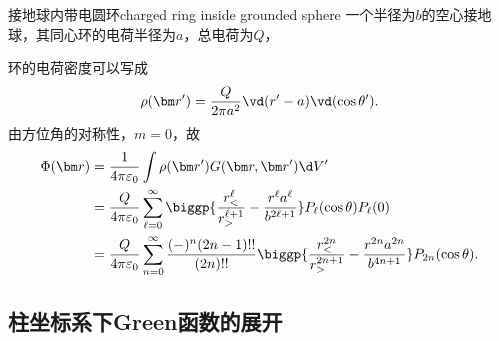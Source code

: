 \begin{example}{接地球内带电圆环}{charged ring inside grounded sphere}
    一个半径为$b$的空心接地球，其同心环的电荷半径为$a$，总电荷为$Q$，

    环的电荷密度可以写成
    \[
        \rho(\bm r')=\frac Q{2\pi a^2}\vd(r'-a)\vd(\cos\theta').
    \]
    由方位角的对称性，$m=0$，故
    \begin{align*}
        \Phi(\bm r)&=\frac1{4\pi\varepsilon_0}\int\rho(\bm r')G(\bm r,\bm r')\d V'\\
        &=\frac Q{4\pi\varepsilon_0}\sum_{\ell=0}^\infty\biggp{\frac{r_<^\ell}{r_>^{\ell+1}}-\frac{r^\ell a^\ell}{b^{2\ell+1}}}P_\ell(\cos\theta)P_\ell(0)\\
        &=\frac Q{4\pi\varepsilon_0}\sum_{n=0}^\infty\frac{(-)^n(2n-1)!!}{(2n)!!}\biggp{\frac{r_<^{2n}}{r_>^{2n+1}}-\frac{r^{2n}a^{2n}}{b^{4n+1}}}P_{2n}(\cos\theta).
    \end{align*}
\end{example}

\subsection{柱坐标系下Green函数的展开}
\label{ssec: Green expansion in cylindrical coordinate}

